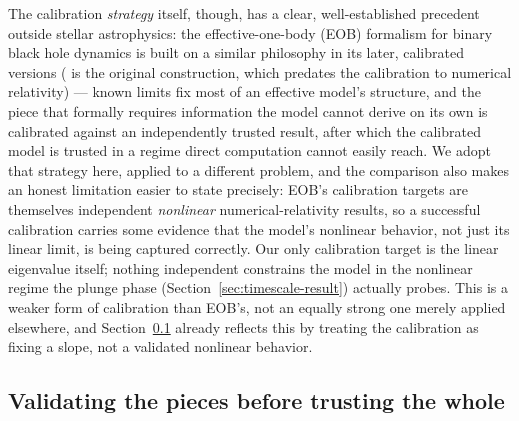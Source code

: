 \documentclass[11pt]{article}
\begin{document}
The calibration \emph{strategy} itself, though, has a clear, well-established precedent outside stellar astrophysics: the effective-one-body (EOB) formalism for binary black hole dynamics \citep{BuonannoDamour1999} is built on a similar philosophy in its later, calibrated versions (\citealt{BuonannoDamour1999} is the original construction, which predates the calibration to numerical relativity) --- known limits fix most of an effective model's structure, and the piece that formally requires information the model cannot derive on its own is calibrated against an independently trusted result, after which the calibrated model is trusted in a regime direct computation cannot easily reach. We adopt that strategy here, applied to a different problem, and the comparison also makes an honest limitation easier to state precisely: EOB's calibration targets are themselves independent \emph{nonlinear} numerical-relativity results, so a successful calibration carries some evidence that the model's nonlinear behavior, not just its linear limit, is being captured correctly. Our only calibration target is the linear eigenvalue itself; nothing independent constrains the model in the nonlinear regime the plunge phase (Section~\ref{sec:timescale-result}) actually probes. This is a weaker form of calibration than EOB's, not an equally strong one merely applied elsewhere, and Section~\ref{sec:timescale-validation} already reflects this by treating the calibration as fixing a slope, not a validated nonlinear behavior.

\subsection{Validating the pieces before trusting the whole}
\label{sec:timescale-validation}
\end{document}
